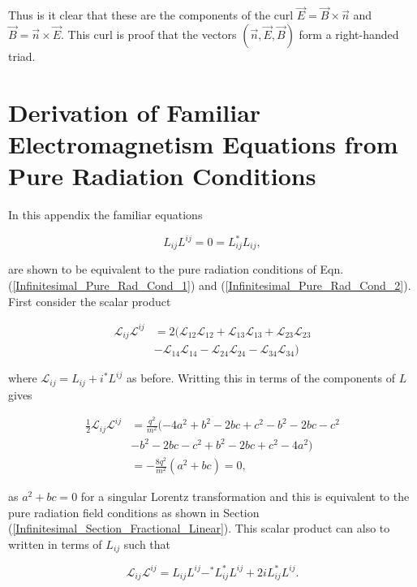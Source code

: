\begin{appendix}
\noindent Thus is it clear that these are the components of the curl $\vec{E} = \vec{B} \times \vec{n}$ and $\vec{B} = \vec{n} \times \vec{E}$. This curl is proof that the vectors $(\vec{n}, \vec{E}, \vec{B})$ form a right-handed triad. 

\section{Derivation of Familiar Electromagnetism Equations from Pure Radiation Conditions}\label{Appendix_Familair_EM_from_Pure_Cond}

In this appendix the familiar equations

\begin{equation*}
L_{ij}L^{ij} = 0 = L_{ij} ^{*}L_{ij},
\end{equation*}

\noindent are shown to be equivalent to the pure radiation conditions of Eqn.(\ref{Infinitesimal_Pure_Rad_Cond_1}) and (\ref{Infinitesimal_Pure_Rad_Cond_2}). First consider the scalar product

\begin{align*}
\mathcal{L}_{ij} \mathcal{L}^{ij} & = 2( \mathcal{L}_{12}\mathcal{L}_{12}+\mathcal{L}_{13} \mathcal{L}_{13}+\mathcal{L}_{23}\mathcal{L}_{23} \\
                                  & - \mathcal{L}_{14} \mathcal{L}_{14} - \mathcal{L}_{24}\mathcal{L}_{24} - \mathcal{L}_{34}\mathcal{L}_{34})
\end{align*}

\noindent where $\mathcal{L}_{ij} = L_{ij} + i ^{*}L^{ij}$ as before. Writting this in terms of the components of $L$ gives

\begin{align*}
\frac{1}{2} \mathcal{L}_{ij} \mathcal{L}^{ij} & = \frac{q^2}{m^2} ( -4a^2 + b^2 - 2bc + c^2 - b^2 - 2bc - c^2 \\
                                              & - b^2 - 2bc - c^2 + b^2 - 2bc + c^2 - 4a^2) \\
                                              & = -\frac{8q^2}{m^2} (a^2 + bc) = 0,  
\end{align*}

\noindent as $a^2 + bc = 0$ for a singular Lorentz transformation and this is equivalent to the pure radiation field conditions as shown in Section (\ref{Infinitesimal_Section_Fractional_Linear}). This scalar product can also to written in terms of $L_{ij}$ such that

\begin{equation*}
\mathcal{L}_{ij} \mathcal{L}^{ij} = L_{ij}L^{ij} - ^{*}L_{ij}^{*}L^{ij} +2i L_{ij}^{*}L^{ij}.
\end{equation*}


\end{appendix}

